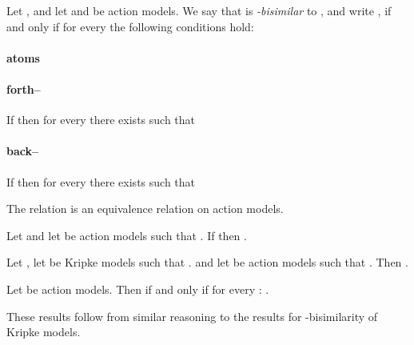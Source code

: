 \documentclass[twoside]{aiml14}
\begin{document}
  \begin{definition}
      Let , 
      and let  
      and 
      be action models.
      We say that  is {\em -bisimilar} 
      to ,
      and write , 
      if and only if for every  the following conditions hold:

      \paragraph{atoms}
      

      \paragraph{forth--}
      If  then
      for every  
      there exists 
      such that  

      \paragraph{back--}
      If  then
      for every 
      there exists  
      such that  
  \end{definition}

  \begin{proposition}
      The relation  is an equivalence relation on action models.
  \end{proposition}

  \begin{proposition}
      Let  and 
      let  be action models 
      such that . 
      If  then . 
  \end{proposition}

  \begin{proposition}
      Let ,
      let  be Kripke models such that
      . 
      and let  be action models such that
      .
      Then
      .
  \end{proposition}

  \begin{proposition}
      Let  be action models.
      Then 
      if and only if for every : 
      .
  \end{proposition}

  These results follow from similar reasoning to the results for -bisimilarity of Kripke models.
\end{document}
